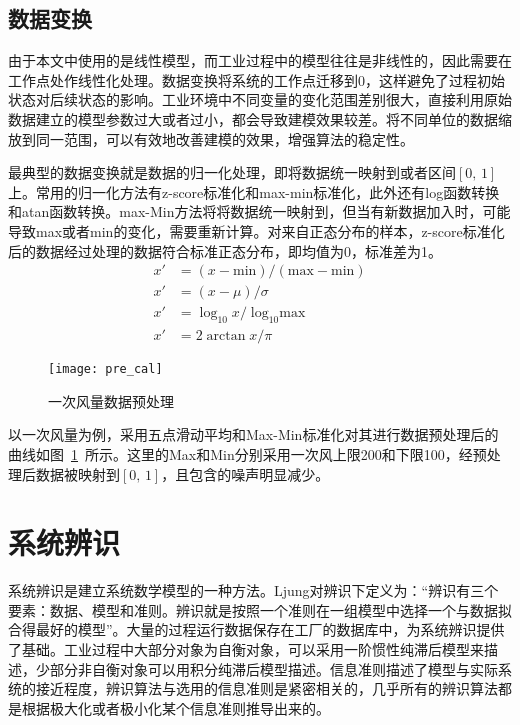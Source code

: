 \subsection{数据变换}

由于本文中使用的是线性模型，而工业过程中的模型往往是非线性的，因此需要在工作点处作线性化处理。数据变换将系统的工作点迁移到0，这样避免了过程初始状态对后续状态的影响。工业环境中不同变量的变化范围差别很大，直接利用原始数据建立的模型参数过大或者过小，都会导致建模效果较差。将不同单位的数据缩放到同一范围，可以有效地改善建模的效果，增强算法的稳定性。

最典型的数据变换就是数据的归一化处理，即将数据统一映射到或者区间$[0,\,  1]$上。常用的归一化方法有z-score标准化和max-min标准化，此外还有log函数转换和atan函数转换。max-Min方法将将数据统一映射到，但当有新数据加入时，可能导致max或者min的变化，需要重新计算。对来自正态分布的样本，z-score标准化后的数据经过处理的数据符合标准正态分布，即均值为0，标准差为1。
\begin{align}
x'&=(x - \textrm{min})/(\textrm{max}- \textrm{min}) \\
x'&=(x - \mu)/{\sigma} \\
x'&={\log_{10}{x}}/{\log_{10}{\textrm{max}}}\\
x'&={2\arctan{x}}/{\pi}
\end{align}

\begin{figure}[!htb]
\centering
\texttt{[image: pre\_cal]}
\caption{一次风量数据预处理} \label{fig:pre_cal}
\end{figure}

以一次风量为例，采用五点滑动平均和Max-Min标准化对其进行数据预处理后的曲线如图~\ref{fig:pre_cal}~所示。这里的Max和Min分别采用一次风上限200和下限100，经预处理后数据被映射到$[0,\, 1]$，且包含的噪声明显减少。



\section{系统辨识}
\label{sec:mod_ide}

系统辨识是建立系统数学模型的一种方法。Ljung对辨识下定义为：“辨识有三个要素：数据、模型和准则。辨识就是按照一个准则在一组模型中选择一个与数据拟合得最好的模型”。大量的过程运行数据保存在工厂的数据库中，为系统辨识提供了基础。工业过程中大部分对象为自衡对象，可以采用一阶惯性纯滞后模型来描述，少部分非自衡对象可以用积分纯滞后模型描述。信息准则描述了模型与实际系统的接近程度，辨识算法与选用的信息准则是紧密相关的，几乎所有的辨识算法都是根据极大化或者极小化某个信息准则推导出来的\cite{陈霸东2011系统参数辨识的信息准则及算法}。

